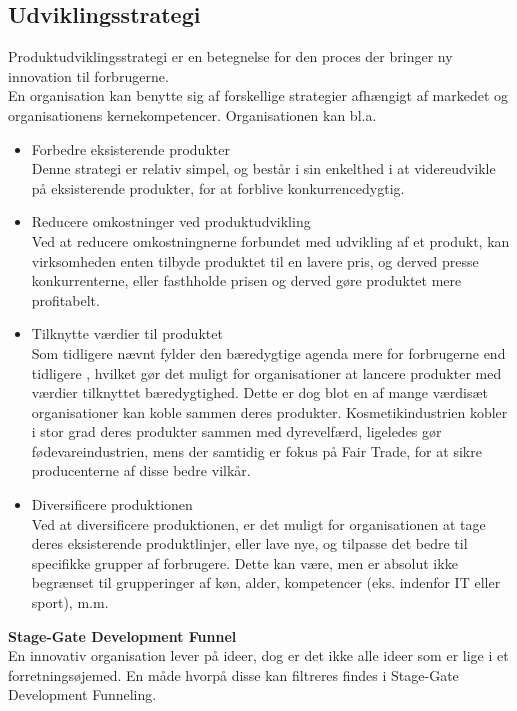 \subsection{Udviklingsstrategi}
\cite{PDS}Produktudviklingsstrategi er en betegnelse for den proces der bringer ny innovation til forbrugerne.
\\En organisation kan benytte sig af forskellige strategier afhængigt af markedet og organisationens kernekompetencer. Organisationen kan bl.a.
\begin{itemize}
    \item Forbedre eksisterende produkter
    \\Denne strategi er relativ simpel, og består i sin enkelthed i at videreudvikle på eksisterende produkter, for at forblive konkurrencedygtig.
    \item Reducere omkostninger ved produktudvikling
    \\Ved at reducere omkostningnerne forbundet med udvikling af et produkt, kan virksomheden enten tilbyde produktet til en lavere pris, og derved presse konkurrenterne, eller fasthholde prisen og derved gøre produktet mere profitabelt.
    \item Tilknytte værdier til produktet
    \\Som tidligere nævnt fylder den bæredygtige agenda mere for forbrugerne end tidligere \cite[a.1]{eksamensopgave}, hvilket gør det muligt for organisationer at lancere produkter med værdier tilknyttet bæredygtighed.
    Dette er dog blot en af mange værdisæt organisationer kan koble sammen deres produkter. Kosmetikindustrien kobler i stor grad deres produkter sammen med dyrevelfærd, ligeledes gør fødevareindustrien, mens der samtidig er fokus på Fair Trade, for at sikre producenterne af disse bedre vilkår.
    \item Diversificere produktionen
    \\Ved at diversificere produktionen, er det muligt for organisationen at tage deres eksisterende produktlinjer, eller lave nye, og tilpasse det bedre til specifikke grupper af forbrugere. Dette kan være, men er absolut ikke begrænset til grupperinger af køn, alder, kompetencer (eks. indenfor IT eller sport), m.m.
\end{itemize}
\textbf{Stage-Gate Development Funnel}
\\En innovativ organisation lever på ideer, dog er det ikke alle ideer som er lige i et forretningsøjemed. En måde hvorpå disse kan filtreres findes i Stage-Gate Development Funneling.
